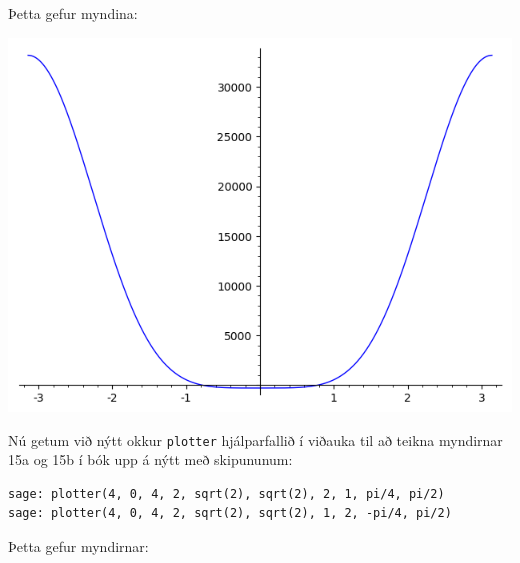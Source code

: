 \documentclass{article}
\begin{document}
Þetta gefur myndina: \\

\begin{center}
\includegraphics[scale=0.75]{lidur2plot}
\end{center}

\vspace*{0.5cm}

Nú getum við nýtt okkur \verb|plotter| hjálparfallið í viðauka til að teikna myndirnar 15a og 15b í bók upp á nýtt með skipununum: \\

\begin{verbatim}
sage: plotter(4, 0, 4, 2, sqrt(2), sqrt(2), 2, 1, pi/4, pi/2)
sage: plotter(4, 0, 4, 2, sqrt(2), sqrt(2), 1, 2, -pi/4, pi/2)
\end{verbatim}

\vspace*{0.5cm}

Þetta gefur myndirnar: \\
\end{document}
